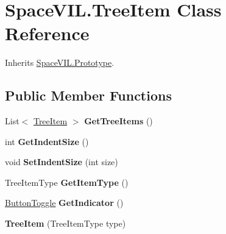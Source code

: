 \hypertarget{class_space_v_i_l_1_1_tree_item}{}\section{Space\+V\+I\+L.\+Tree\+Item Class Reference}
\label{class_space_v_i_l_1_1_tree_item}


Inherits \mbox{\hyperlink{class_space_v_i_l_1_1_prototype}{Space\+V\+I\+L.\+Prototype}}.

\subsection*{Public Member Functions}
\begin{DoxyCompactItemize}
\item 
\mbox{\label{class_space_v_i_l_1_1_tree_item_a04cc3cff3b60fc185b652f04175d59bf}} 
List$<$ \mbox{\hyperlink{class_space_v_i_l_1_1_tree_item}{Tree\+Item}} $>$ {\bfseries Get\+Tree\+Items} ()
\item 
\mbox{\label{class_space_v_i_l_1_1_tree_item_a914d914d7f8a796875eb700dfe89e971}} 
int {\bfseries Get\+Indent\+Size} ()
\item 
\mbox{\label{class_space_v_i_l_1_1_tree_item_a7c3087d3b489be9dc0987a2f471cd5d4}} 
void {\bfseries Set\+Indent\+Size} (int size)
\item 
\mbox{\label{class_space_v_i_l_1_1_tree_item_a0e03223eba47c946a2e99b9b9e0f0002}} 
Tree\+Item\+Type {\bfseries Get\+Item\+Type} ()
\item 
\mbox{\label{class_space_v_i_l_1_1_tree_item_af82cc9b8bdc775c53fc3eaf9d9f6a920}} 
\mbox{\hyperlink{class_space_v_i_l_1_1_button_toggle}{Button\+Toggle}} {\bfseries Get\+Indicator} ()
\item 
\mbox{\label{class_space_v_i_l_1_1_tree_item_a59309d2dd1b95c9bece99fe921765313}} 
{\bfseries Tree\+Item} (Tree\+Item\+Type type)
\item 
\mbox{\label{class_space_v_i_l_1_1_tree_item_a8fc711463af22531c6727df6b840f1e6}} 

\end{DoxyCompactItemize}
